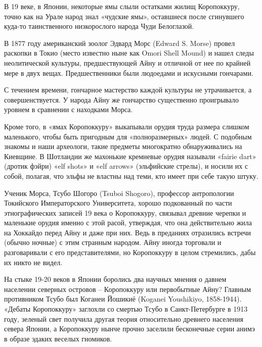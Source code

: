 В 19 веке, в Японии, некоторые ямы слыли остатками жилищ Коропоккуру, точно как на Урале народ знал «чудские ямы», оставшиеся после сгинувшего куда-то таинственного низкорослого народа Чуди Белоглазой.

В 1877 году американский зоолог Эдвард Морс (Ed\-ward S. Morse) провел раскопки в Токио (место известно ныне как Omori Shell Mound) и нашел следы неолитической культуры, предшествующей Айну и отличной от нее по крайней мере в двух вещах. Предшественники были людоедами и искусными гончарами.

С течением времени, гончарное мастерство каждой культуры не утрачивается, а совершенствуется. У народа Айну же гончарство существенно проигрывало уровнем в сравнении с находками Морса.

Кроме того, в «ямах Коропоккуру» выкапывали орудия труда размера слишком маленького, чтобы быть пригодным для «полноразмерных» людей. С подобным знакомы и наши археологи, такие предметы многократно обнаруживались на Киевщине. В Шотландии же махонькие кремневые орудия называли «fairie dart» (дротик фэйри) «elf shots» и «elf arrows» (эльфийские стрелы), и носили их с собой, полагая, что эльфы не властны над теми, кто имеет при себе такую штуку.

Ученик Морса, Тсубо Шогоро (Tsuboi Shogoro), профессор антропологии Токийского Императорского Университета, хорошо подкованный по части этнографических записей 19 века о Коропоккуру, связывал древние черепки и маленькие орудия именно с этой расой, утверждая, что она действительно жила на Хоккайдо перед Айну и даже при них. Ведь в преданиях отразились встречи (обычно ночные) с этим странным народом. Айну иногда торговали и разговаривали с его представителями, но Коропоккуру в целом стремились, дабы их никто не видел.

На стыке 19-20 веков в Японии боролись два научных мнения о давнем населении северных островов – Коропоккуру или первобытные Айну? Главным противником Тсубо был Коганеи Йошикиё (Koganei Youshikiyo, 1858-1944). «Дебаты Коропоккуру» заглохли со смертью Тсубо в Санкт-Петербурге в 1913 году, зеленый свет получила другая теория относительно древнего населения севера Японии, а Коропоккуру нынче прочно заселили бесконечные серии анимэ в образе эдаких веселых гномиков.


